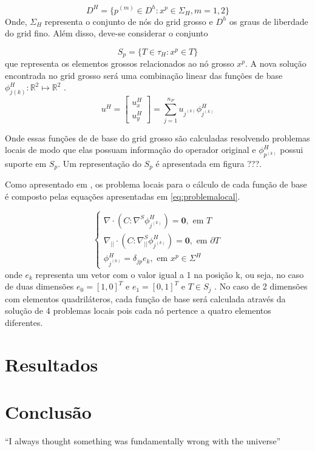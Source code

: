 \documentclass{article}
\begin{document}
\begin{equation}
    D^H = \{ p^{(m)} \in D^h : x^p \in \Sigma_H, m=1,2\}
\end{equation}
Onde, \(\Sigma_H\) representa o conjunto de nós do grid grosso e \(D^h\) os graus de liberdade do grid fino. Além disso, deve-se considerar o conjunto

\begin{equation}
    S_p = \{T \in \tau_H : x^p \in T\}
\end{equation}que representa os elementos grossos relacionados ao nó grosso $x^p $. A nova solução encontrada no grid grosso será uma combinação linear das funções de base $\phi_{j{(k)}}^H : \mathbb{R}^2 \mapsto \mathbb{R}^2 $  .
\begin{equation}
u^H = 
\begin{bmatrix}
u^H_x
\\ 
u^H_y
\end{bmatrix}
= \sum_{j=1}^{n_P} u_{j^{(k)}} \phi^H_{j^{(k)}}
\end{equation}

Onde essas funções de de base do grid grosso são calculadas resolvendo problemas locais de modo que elas possuam informação do operador original e $\phi^H_{p^{(k)}}$  possui suporte em $S_p$.  Um representação do $S_p$ é apresentada em figura ???.




Como apresentado em \cite{casteletto}, os problema locais para o cálculo de cada função de base é  composto pelas equações apresentadas em \ref{eq:problemalocal}. 

\begin{equation} \label{eq:problemalocal}
\left\{\begin{matrix}
\nabla \cdotp (C:\nabla ^ S \phi^H_{j^{(k)}}) = \mathbf{0}, \text{   em  } T
\\ 
\nabla_{||} \cdotp (C:\nabla_{||} ^ S \phi^H_{j^{(k)}}) = \mathbf{0}, \text{  em   } \partial T
\\ 
\phi^H_{j^{(k)}} = \delta_{jp} e_k, \text{    em   } x^p \in \Sigma ^ H
\end{matrix}\right.
\end{equation}onde $e_k$ representa um vetor com o valor igual a 1 na posição k, ou seja, no caso de duas dimensões $e_0 = [1, 0]^T$ e $e_1  = [0, 1]^T$ e $T \in S_j$ . No caso de 2 dimensões com elementos quadriláteros, cada função de base será calculada através da solução de 4 problemas locais pois cada nó pertence a quatro elementos diferentes. 




\section{Resultados}


\section{Conclusão}
``I always thought something was fundamentally wrong with the universe'' \citep{adams1995hitchhiker}



\end{document}
